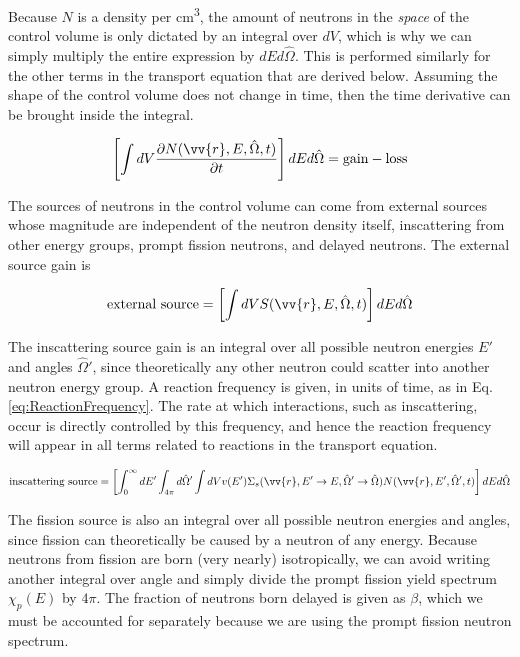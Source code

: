 \documentclass[10pt]{article}
\begin{document}
\begin{flushleft}
Because \(N\) is a density per cm\textsuperscript{3}, the amount of neutrons in the \textit{space} of the control volume is only dictated by an integral over \(dV\), which is why we can simply multiply the entire expression by \(dEd\hat{\Omega}\). This is performed similarly for the other terms in the transport equation that are derived below. Assuming the shape of the control volume does not change in time, then the time derivative can be brought inside the integral.

\begin{equation}
\label{eq:Conservation2}
\left\lbrack\int dV \frac{\partial N(\vv{r}, E, \hat{\Omega},t) }{\partial t}\right\rbrack dEd\hat{\Omega} = \textrm{gain} - \textrm{loss}
\end{equation}

The sources of neutrons in the control volume can come from external sources whose magnitude are independent of the neutron density itself, inscattering from other energy groups, prompt fission neutrons, and delayed neutrons. The external source gain is

\begin{equation}
\label{eq:ConservationExternalSource}
\textrm{external source} = \left\lbrack\int dV S(\vv{r}, E, \hat{\Omega},t)\right\rbrack dEd\hat{\Omega}
\end{equation}

The inscattering source gain is an integral over all possible neutron energies \(E'\) and angles \(\hat{\Omega}'\), since theoretically any other neutron could scatter into another neutron energy group. A reaction frequency is given, in units of time, as in Eq. \ref{eq:ReactionFrequency}. The rate at which interactions, such as inscattering, occur is directly controlled by this frequency, and hence the reaction frequency will appear in all terms related to reactions in the transport equation.

\begin{equation}
\label{eq:ConservationInscatteringSource}
\textrm{inscattering source} = \left\lbrack\int_{0}^{\infty} dE'\int_{4\pi}^{} d\hat{\Omega}'\int dV v(E')\Sigma_s(\vv{r},E'\rightarrow E, \hat{\Omega}'\rightarrow\hat{\Omega}) N(\vv{r}, E', \hat{\Omega}',t)\right\rbrack dEd\hat{\Omega}
\end{equation}

The fission source is also an integral over all possible neutron energies and angles, since fission can theoretically be caused by a neutron of any energy. Because neutrons from fission are born (very nearly) isotropically, we can avoid writing another integral over angle and simply divide the prompt fission yield spectrum \(\chi_p(E)\) by \(4\pi\). The fraction of neutrons born delayed is given as \(\beta\), which we must be accounted for separately because we are using the prompt fission neutron spectrum.


\end{flushleft}
\end{document}
